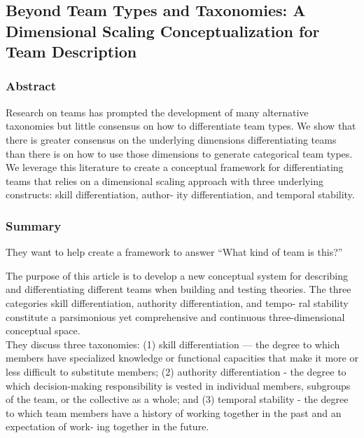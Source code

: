 \documentclass[12pt]{article}
\begin{document}

\subsection*{Beyond Team Types and Taxonomies: A Dimensional Scaling Conceptualization for Team Description\cite{team_description}}

\subsubsection*{Abstract}

Research on teams has prompted the development of many alternative taxonomies but little consensus on how to differentiate team types. We show that there is greater consensus on the underlying dimensions differentiating teams than there is on how to use those dimensions to generate categorical team types. We leverage this literature to create a conceptual framework for differentiating teams that relies on a dimensional scaling approach with three underlying constructs: skill differentiation, author- ity differentiation, and temporal stability.

\subsubsection*{Summary}

They want to help create a framework to answer “What kind of team is this?”

The purpose of this article is to develop a new conceptual system for describing and differentiating different teams when building and testing theories. The three categories skill differentiation, authority differentiation, and tempo- ral stability constitute a parsimonious yet comprehensive and continuous three-dimensional conceptual space.\\

They discuss three taxonomies:  (1) skill differentiation — the degree to which members have specialized knowledge or functional capacities that make it more or less difficult to substitute members; (2) authority differentiation - the degree to which decision-making responsibility is vested in individual members, subgroups of the team, or the collective as a whole; and (3) temporal stability - the degree to which team members have a history of working together in the past and an expectation of work- ing together in the future.\\
\end{document}
